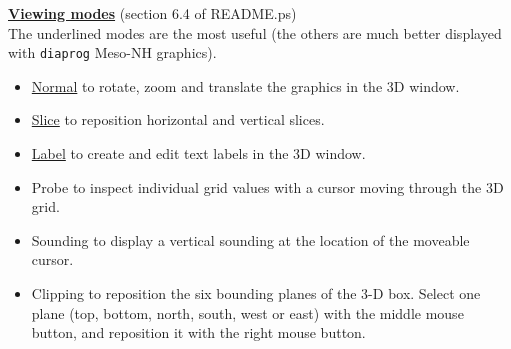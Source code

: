 \underline{\bf Viewing modes} \label{sss:viewing}(section 6.4 of README.ps) \\
The underlined modes are the most useful (the others are much better displayed
with {\tt diaprog} Meso-NH graphics).
\begin{itemize}
\item\underline{\sf Normal} 
 to rotate, zoom and translate the graphics in the 3D window.

%
\item\underline{\sf Slice}
 to reposition horizontal and vertical slices.

\item\underline{\sf Label}
 to create and edit text labels in the 3D window.

\item{\sf Probe}
 to inspect individual grid values with a cursor moving through the 3D grid.

\item{\sf Sounding}
 to display a vertical sounding at the location of the moveable cursor.

\item{\sf Clipping}
 to reposition the six bounding planes of the 3-D box. Select one plane (top, bottom,
 north, south, west or east) with the middle mouse button, and reposition it
 with the right mouse button.

\end{itemize}

